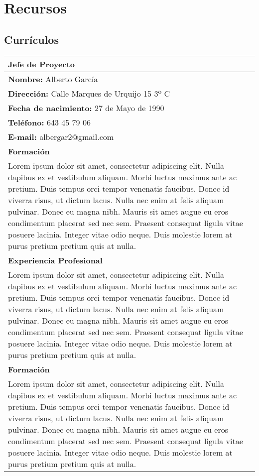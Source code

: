 \section{Recursos}
\subsection{Currículos}

\begin{table}[H]
\begin{center}
\begin{tabular}{p{}}
\textbf{Jefe de Proyecto}  \\
\hline
\textbf{Nombre:} Alberto García\\
\textbf{Dirección:} Calle Marques de Urquijo 15 3º C\\
\textbf{Fecha de nacimiento:} 27 de Mayo de 1990 \\
\textbf{Teléfono:} 643 45 79 06\\
\textbf{E-mail:} albergar2@gmail.com\\
\hline \hline
\textbf{Formación}  \\
\hline 
Lorem ipsum dolor sit amet, consectetur adipiscing elit. Nulla dapibus ex et vestibulum aliquam. Morbi luctus maximus ante ac pretium. Duis tempus orci tempor venenatis faucibus. Donec id viverra risus, ut dictum lacus. Nulla nec enim at felis aliquam pulvinar. Donec eu magna nibh. Mauris sit amet augue eu eros condimentum placerat sed nec sem. Praesent consequat ligula vitae posuere lacinia. Integer vitae odio neque. Duis molestie lorem at purus pretium pretium quis at nulla. \\
\hline \hline
\textbf{Experiencia Profesional}  \\
\hline
Lorem ipsum dolor sit amet, consectetur adipiscing elit. Nulla dapibus ex et vestibulum aliquam. Morbi luctus maximus ante ac pretium. Duis tempus orci tempor venenatis faucibus. Donec id viverra risus, ut dictum lacus. Nulla nec enim at felis aliquam pulvinar. Donec eu magna nibh. Mauris sit amet augue eu eros condimentum placerat sed nec sem. Praesent consequat ligula vitae posuere lacinia. Integer vitae odio neque. Duis molestie lorem at purus pretium pretium quis at nulla. \\
\hline \hline
\textbf{Formación}  \\
\hline
Lorem ipsum dolor sit amet, consectetur adipiscing elit. Nulla dapibus ex et vestibulum aliquam. Morbi luctus maximus ante ac pretium. Duis tempus orci tempor venenatis faucibus. Donec id viverra risus, ut dictum lacus. Nulla nec enim at felis aliquam pulvinar. Donec eu magna nibh. Mauris sit amet augue eu eros condimentum placerat sed nec sem. Praesent consequat ligula vitae posuere lacinia. Integer vitae odio neque. Duis molestie lorem at purus pretium pretium quis at nulla. \\

\end{tabular}
\end{center}
\end{table}

